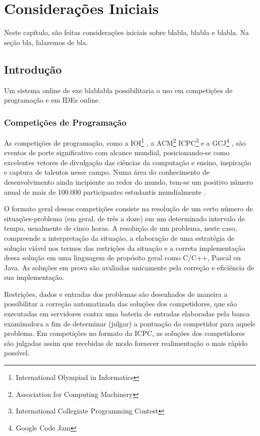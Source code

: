\documentclass[ruledheader]{abnt}
\begin{document}
\tableofcontents

\listoffigures

\listoftables

\chapter{Considerações Iniciais}

Neste capítulo, são feitas considerações iniciais sobre blabla, blabla e blabla. Na seção bla, falaremos de bla.

\section{Introdução}

Um sistema online de exe blablabla possibilitaria o uso em competições de programação e em IDEs online.

\subsection{Competições de Programação}

As competições de programação, como a IOI\footnote{International Olympiad in Informatics} \cite{ioinformatics}, a ACM\footnote{Association for Computing Machinery} ICPC\footnote{International Collegiate Programming Contest} \cite{acmicpc} e a GCJ\footnote{Google Code Jam} \cite{googlecodejam}, são eventos de porte significativo com alcance mundial, posicionando-se como excelentes vetores de divulgação das ciências da computação e ensino, inspiração e captura de talentos nesse campo. Numa área do conhecimento de desenvolvimento ainda incipiente ao redor do mundo, tem-se um positivo número anual de mais de 100.000 participantes estudantis mundialmente \cite{icpcfactsheet,wang2010selection}.

O formato geral dessas competições consiste na resolução de um certo número de situações-problema (em geral, de três a doze) em um determinado intervalo de tempo, usualmente de cinco horas. A resolução de um problema, neste caso, compreende a interpretação da situação, a elaboração de uma estratégia de solução viável nos termos das restrições da situação e a correta implementação dessa solução em uma linguagem de propósito geral como C/C++, Pascal ou Java. As soluções em prova são avaliadas unicamente pela correção e eficiência de sua implementação. 

Restrições, dados e entradas dos problemas são desenhados de maneira a possibilitar a correção automatizada das soluções dos competidores, que são executadas em servidores contra uma bateria de entradas elaboradas pela banca examinadora a fim de determinar (julgar) a pontuação do competidor para aquele problema. Em competições no formato da ICPC, as soluções dos competidores são julgadas assim que recebidas de modo fornecer realimentação o mais rápido possível.
\end{document}
